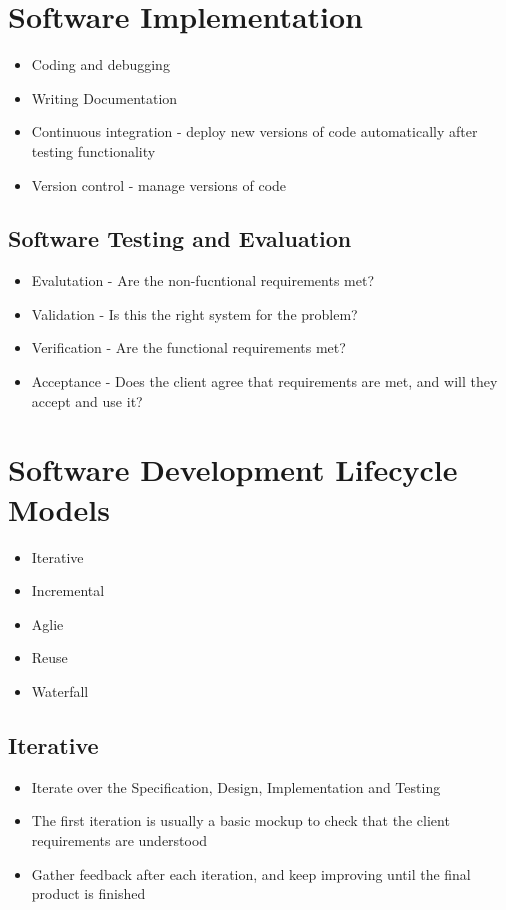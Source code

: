 \section*{Software Implementation}

\begin{itemize}
  \item Coding and debugging
  \item Writing Documentation
  \item Continuous integration - deploy new versions of code automatically after testing functionality
  \item Version control - manage versions of code
\end{itemize}
  
\subsection*{Software Testing and Evaluation}

\begin{itemize}
  \item Evalutation - Are the non-fucntional requirements met?
  \item Validation - Is this the right system for the problem?
  \item Verification - Are the functional requirements met?
  \item Acceptance - Does the client agree that requirements are met, and will they accept and use it?
\end{itemize}

\section*{Software Development Lifecycle Models}

\begin{itemize}
  \item Iterative
  \item Incremental
  \item Aglie
  \item Reuse
  \item Waterfall
\end{itemize}

\subsection*{Iterative}

\begin{itemize}
  \item Iterate over the Specification, Design, Implementation and Testing
  \item The first iteration is usually a basic mockup to check that the client requirements are understood
  \item Gather feedback after each iteration, and keep improving until the final product is finished
\end{itemize}

